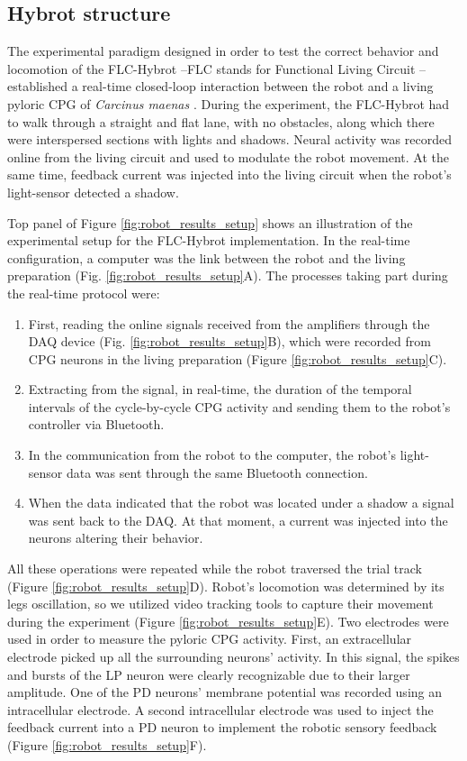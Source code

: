 \subsection{Hybrot structure}
\label{sec:robot setup}
The experimental paradigm designed in order to test the correct behavior and locomotion of the FLC-Hybrot --FLC stands for Functional Living Circuit \parencite{soetard_dynamical_2023}-- established a real-time closed-loop interaction between the robot and a living pyloric CPG of \textit{Carcinus maenas} \parencite{elices_robust_2019}. During the experiment, the FLC-Hybrot had to walk through a straight and flat lane, with no obstacles, along which there were interspersed sections with lights and shadows. Neural activity was recorded online from the living circuit and used to modulate the robot movement. At the same time, feedback current was injected into the living circuit when the robot's light-sensor detected a shadow.

Top panel of Figure \ref{fig:robot_results_setup} shows an illustration of the experimental setup for the FLC-Hybrot implementation. In the real-time configuration, a computer was the link between the robot and the living preparation (Fig. \ref{fig:robot_results_setup}A). The processes taking part during the real-time protocol were:
\begin{enumerate}
	\item First, reading the online signals received from the amplifiers through the DAQ device (Fig. \ref{fig:robot_results_setup}B), which were recorded from CPG neurons in the living preparation (Figure \ref{fig:robot_results_setup}C).
	\item Extracting from the signal, in real-time, the duration of the temporal intervals of the cycle-by-cycle CPG activity and sending them to the robot's controller via Bluetooth.
	\item In the communication from the robot to the computer, the robot's light-sensor data was sent through the same Bluetooth connection.
	\item When the data indicated that the robot was located under a shadow a signal was sent back to the DAQ. At that moment, a current was injected into the neurons altering their behavior.
\end{enumerate}

All these operations were repeated while the robot traversed the trial track (Figure \ref{fig:robot_results_setup}D). Robot's locomotion was determined by its legs oscillation, so we utilized video tracking tools to capture their movement during the experiment (Figure \ref{fig:robot_results_setup}E). Two electrodes were used in order to measure the pyloric CPG activity. First, an extracellular electrode picked up all the surrounding neurons' activity. In this signal, the spikes and bursts of the LP neuron were clearly recognizable due to their larger amplitude. One of the PD neurons' membrane potential was recorded using an intracellular electrode. A second intracellular electrode was used to inject the feedback current into a PD neuron to implement the robotic sensory feedback (Figure \ref{fig:robot_results_setup}F).


